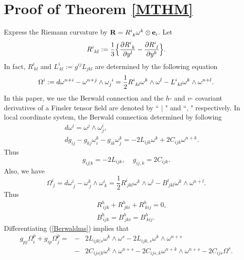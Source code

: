 \documentclass[10pt,a4paper]{amsart}
\newcommand{\be}{\begin{equation}}
\newcommand{\ee}{\end{equation}}
\begin{document}
\section{Proof of Theorem \ref{MTHM}}
Express the Riemann curvature by
${\bf R}= R^i_{\ k} \omega^k \otimes {\bf e}_i$.
Let
\be
R^i_{\ kl}:= {1\over 3} \Big \{\frac{\partial R^i_{\ k}}{\partial y^l} - \frac{\partial R^i_{\ l}}{\partial y^k} \Big \}.\label{Kikl}
\ee
In fact,  $R^i_{\ kl}$ and $L^i_{\ kl}:= g^{ij}L_{jkl}$ are determined by the following equation
\[
\Omega^i := d\omega^{n+i}-\omega^{n+j} \wedge \omega_j^{\ i}
= {1\over 2} R^i_{\  kl}\omega^k \wedge \omega^l - L^i_{\ kl} \omega^k \wedge \omega^{n+l}.
\]
In this paper, we use the Berwald connection  and the $h$- and $v$- covariant derivatives of a Finsler tensor field are denoted by `` $|$ " and ``, " respectively. In local coordinate system, the Berwald connection determined by following
\begin{eqnarray}
&&d\omega^i = \omega^j \wedge \omega^i_j,\\
&&dg_{ij}- g_{kj}\omega^k_i - g_{ik}\omega^k_j = -2L_{ijk}\omega^k + 2C_{ijk}\omega^{n+k}.\label{Berwaldms}
\end{eqnarray}
Thus
\[
g_{ij|k}= -2L_{ijk},   \ \ \ \ \ g_{ij,k}= 2C_{ijk}.
\]
Also, we have
\begin{equation}
\Omega^i_{\ j}=d\omega^i_{\ j}-\omega^k_{\ j}\wedge\omega^i_{\
k}=\frac{1}{2}R^i_{\ jkl}\omega^k\wedge\omega^l-B^i_{\
jkl}\omega^k\wedge\omega^{n+l}.\label{BCon}
  \end{equation}
Thus
\begin{eqnarray}
&&R^h_{\ ijk}+ R^h_{\ jki}+ R^h_{\ kij}=0,\label{xxxzzz}\\
&&B^h_{\ ijk}=B^h_{\ jki}=B^h_{\ kij}.
\end{eqnarray}
Differentiating (\ref{Berwaldms}) implies that
\begin{eqnarray}
\nonumber g_{pj}\Omega^p_i+g_{ip}\Omega^p_j=\!\!\!\!&-&\!\!\!\!\! 2L_{ijk|s}\omega^k\wedge\omega^s-2L_{ijk,s}\omega^k\wedge\omega^{n+s}\\
\!\!\!\!&-&\!\!\!\!\! 2C_{ijs|k}\omega^k\wedge\omega^{n+s}-2C_{ijs,k}\omega^{n+k}\wedge\omega^{n+s}-2C_{ijs}\Omega^s.\label{mohem2}
\end{eqnarray}
\end{document}
